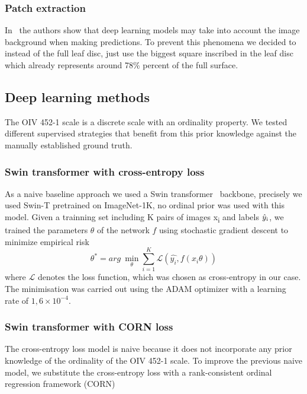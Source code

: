 \documentclass[english]{article}
\begin{document}
\subsubsection{Patch extraction}
In~\parencite{leeNewPerspectivesPlant2020} the authors show that deep learning models may take into account the image background when making predictions. To prevent this phenomena we decided to instead of the full leaf disc, just use the biggest square inscribed in the leaf disc which already represents around 78\% percent of the full surface.

\subsection{Deep learning methods}
The OIV 452-1 scale is a discrete scale with  an ordinality property. We tested different supervised strategies that benefit from this prior knowledge against the manually established ground truth.

\subsubsection{Swin transformer with cross-entropy loss}
As a naive baseline approach we used a Swin transformer~\parencite{liuSwinTransformerHierarchical2021} backbone, precisely we used Swin-T pretrained on ImageNet-1K, no ordinal prior was used with this model. Given a trainning set including K pairs of images x\textsubscript{i} and labels $\hat{y}\textsubscript{i}$, we trained the parameters $\theta$ of the network $f$ using stochastic gradient descent to minimize empirical risk
\begin{equation}
    \theta^*=arg~\min_{\theta} \sum_{i=1}^K\mathcal{L}(\hat{y_i}, f(x_{i}\theta))\label{fml:crossentropy}
\end{equation}
where $\mathcal{L}$ denotes the loss function, which was chosen as cross-entropy in our case. The minimisation was carried out using the ADAM optimizer with a learning rate of $1,6\times 10^{-4}$.

\subsubsection{Swin transformer with CORN loss}
The cross-entropy loss model is naive because it does not incorporate any prior knowledge of the ordinality of the OIV 452-1 scale. To improve the previous naive model, we substitute the cross-entropy loss with a rank-consistent ordinal regression framework (CORN)~\parencite{shiDeepNeuralNetworks2023}
\end{document}
